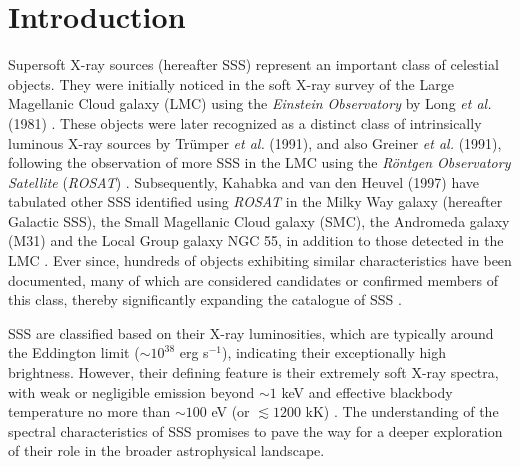 \section{Introduction}
    
    Supersoft X-ray sources (hereafter SSS) represent an important class of celestial objects. They were initially noticed in the soft X-ray survey  of the Large Magellanic Cloud galaxy (LMC) using the \textit{Einstein Observatory} by Long \textit{et al.} (1981) \cite{long81}. These objects were later recognized as a distinct class of intrinsically luminous X-ray sources by Trümper \textit{et al.} (1991), and also Greiner \textit{et al.} (1991), following the observation of more SSS in the LMC using the \textit{R\"{o}ntgen Observatory Satellite} (\textit{ROSAT}) \cite{trumper1991x, greiner1991rosat}. Subsequently, Kahabka and van den Heuvel (1997) have tabulated other SSS identified using \textit{ROSAT} in the Milky Way galaxy (hereafter Galactic SSS), the Small Magellanic Cloud galaxy (SMC), the Andromeda galaxy (M31) and the Local Group galaxy NGC 55, in addition to those detected in the LMC \cite{kahabka97}. Ever since, hundreds of objects exhibiting similar characteristics have been documented, many of which are considered candidates or confirmed members of this class, thereby significantly expanding the catalogue of SSS \cite{kahabkatrumper1996, steinerdiaz1998, greiner2000, pietsch2003deep, di2003luminous, orio2010census, henze2010recent, sturm2012new, galiullin2021populations}.
    
    SSS are classified based on their X-ray luminosities, which are typically around the Eddington limit ($\sim 10^{38}$ erg s$^{-1}$), indicating their exceptionally high brightness. However, their defining feature is their extremely soft X-ray spectra, with weak or negligible emission beyond $\sim 1$ keV and effective blackbody temperature no more than $\sim 100$ eV (or $\lesssim 1200$ kK) \cite{kahabka06}. The understanding of the spectral characteristics of SSS promises to pave the way for a deeper exploration of their role in the broader astrophysical landscape.
    
